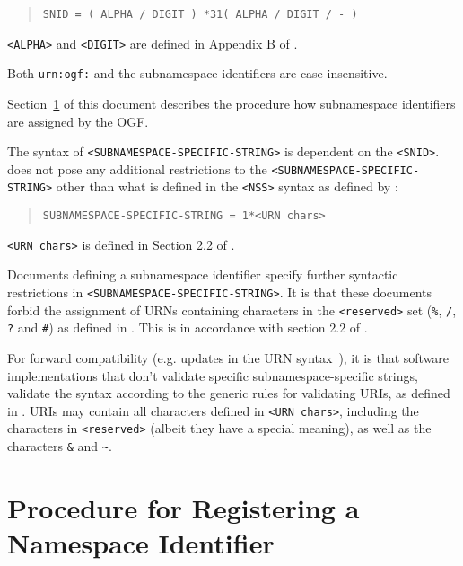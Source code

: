 \documentclass[12pt]{article}  %
\begin{document}
\begin{quote}
  \texttt{SNID  =  ( ALPHA / DIGIT )  *31( ALPHA / DIGIT / \qq{}-\qq{} )}
\end{quote}

\texttt{<ALPHA>} and \texttt{<DIGIT>} are defined in Appendix B of \cite{rfc5234}.

Both \texttt{\qq{}urn:ogf:\qq{}} and the subnamespace identifiers are case insensitive.

Section~\ref{sec:procedure} of this document describes the procedure how subnamespace 
identifiers are assigned by the OGF.

The syntax of \texttt{<SUBNAMESPACE-SPECIFIC-STRING>} is dependent on the \texttt{<SNID>}.
\cite{rfc6453} does not pose any additional restrictions to the
\texttt{<SUBNAMESPACE-SPECIFIC-STRING>} other than what is defined in the
\texttt{<NSS>} syntax as defined by \cite{rfc2141}:

\begin{quote}
  \texttt{SUBNAMESPACE-SPECIFIC-STRING  =  1*<URN chars>}
\end{quote}

\texttt{<URN chars>} is defined in Section 2.2 of \cite{rfc2141}.

Documents defining a subnamespace identifier \SHOULD{} specify further
syntactic restrictions in \texttt{<SUBNAMESPACE-SPECIFIC-STRING>}.  It is
\RECOMMENDED{} that these documents forbid the assignment of URNs
containing characters in the \texttt{<reserved>} set (\texttt{\qq{}\%\qq{}}, 
\texttt{\qq{}/\qq{}}, \texttt{\qq{}?\qq{}} and \texttt{\qq{}\#\qq{}})
as defined in \cite{rfc2141}. This is in accordance with section 2.2 of
\cite{rfc3986}.

For forward compatibility (e.g. updates in the URN syntax~\cite{rfc2141bis}), 
it is \RECOMMENDED{} that software
implementations that don't validate specific subnamespace-specific 
strings, validate the syntax according to the generic rules for validating
URIs, as defined in \cite{rfc3986}.  URIs may contain all characters
defined in \texttt{<URN chars>}, including the characters in \texttt{<reserved>}
(albeit they have a special meaning), as well as the characters \texttt{\qq{}\&\qq{}}
and \texttt{\qq{}\textasciitilde\qq{}}.

\section{Procedure for Registering a Namespace Identifier}%
\label{sec:procedure}
\end{document}
